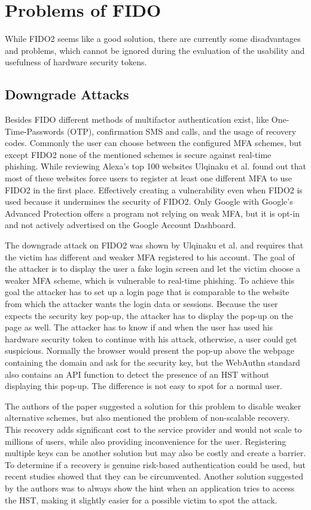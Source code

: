 \documentclass[runningheads]{llncs}
\begin{document}
\section{Problems of FIDO}
While FIDO2 seems like a good solution, there are currently some disadvantages and problems, which cannot be ignored during the evaluation of the usability and usefulness of hardware security tokens.

\subsection{Downgrade Attacks}
Besides FIDO different methods of multifactor authentication exist, like One-Time-Passwords (OTP), confirmation SMS and calls, and the usage of recovery codes. Commonly the user can choose between the configured MFA schemes, but except FIDO2 none of the mentioned schemes is secure against real-time phishing. While reviewing Alexa's top 100 websites Ulqinaku et al. found out that most of these websites force users to register at least one different MFA to use FIDO2 in the first place. Effectively creating a vulnerability even when FIDO2 is used because it undermines the security of FIDO2. Only Google with Google's Advanced Protection offers a program not relying on weak MFA, but it is opt-in and not actively advertised on the Google Account Dashboard.

The downgrade attack on FIDO2 was shown by Ulqinaku et al. and requires that the victim has different and weaker MFA registered to his account. The goal of the attacker is to display the user a fake login screen and let the victim choose a weaker MFA scheme, which is vulnerable to real-time phishing. To achieve this goal the attacker has to set up a login page that is comparable to the website from which the attacker wants the login data or sessions. Because the user expects the security key pop-up, the attacker has to display the pop-up on the page as well. The attacker has to know if and when the user has used his hardware security token to continue with his attack, otherwise, a user could get suspicious. Normally the browser would present the pop-up above the webpage containing the domain and ask for the security key, but the WebAuthn standard also contains an API function to detect the presence of an HST without displaying this pop-up. The difference is not easy to spot for a normal user.\cite{274610}

The authors of the paper suggested a solution for this problem to disable weaker alternative schemes, but also mentioned the problem of non-scalable recovery. This recovery adds significant cost to the service provider and would not scale to millions of users, while also providing inconvenience for the user. Registering multiple keys can be another solution but may also be costly and create a barrier. To determine if a recovery is genuine risk-based authentication could be used, but recent studies showed that they can be circumvented. Another solution suggested by the authors was to always show the hint when an application tries to access the HST, making it slightly easier for a possible victim to spot the attack.
\end{document}
